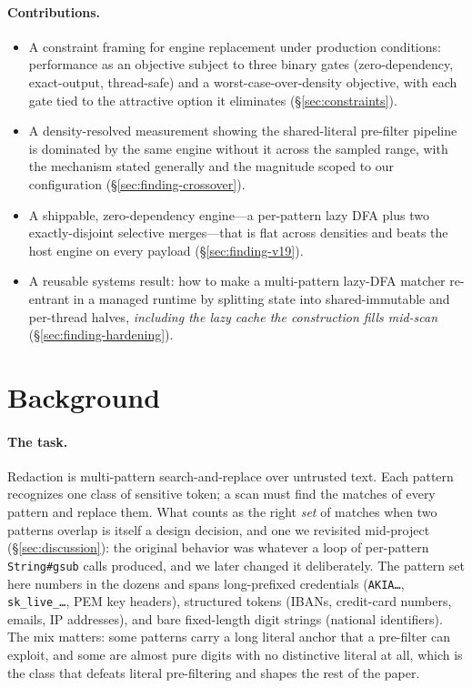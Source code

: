 \documentclass[acmsmall,nonacm,screen]{acmart}
\begin{document}
\paragraph{Contributions.}
\begin{itemize}
  \item A constraint framing for engine replacement under production conditions:
  performance as an objective subject to three binary gates (zero-dependency,
  exact-output, thread-safe) and a worst-case-over-density objective, with each gate
  tied to the attractive option it eliminates (\S\ref{sec:constraints}).
  \item A density-resolved measurement showing the shared-literal pre-filter
  pipeline is dominated by the same engine without it across the sampled range, with
  the mechanism stated generally and the magnitude scoped to our configuration
  (\S\ref{sec:finding-crossover}).
  \item A shippable, zero-dependency engine---a per-pattern lazy DFA plus two
  exactly-disjoint selective merges---that is flat across densities and beats the
  host engine on every payload (\S\ref{sec:finding-v19}).
  \item A reusable systems result: how to make a multi-pattern lazy-DFA matcher
  re-entrant in a managed runtime by splitting state into shared-immutable and
  per-thread halves, \emph{including the lazy cache the construction fills mid-scan}
  (\S\ref{sec:finding-hardening}).
\end{itemize}

\section{Background}
\label{sec:background}
\paragraph{The task.} Redaction is multi-pattern search-and-replace over untrusted
text. Each pattern recognizes one class of sensitive token; a scan must find the
matches of every pattern and replace them. What counts as the right \emph{set} of
matches when two patterns overlap is itself a design decision, and one we revisited
mid-project (\S\ref{sec:discussion}): the original behavior was whatever a loop of
per-pattern \texttt{String\#gsub} calls produced, and we later changed it
deliberately. The pattern set here numbers in the
dozens and spans long-prefixed credentials (\texttt{AKIA\ldots},
\texttt{sk\_live\_\ldots}, PEM key headers), structured tokens (IBANs, credit-card
numbers, emails, IP addresses), and bare fixed-length digit strings (national
identifiers). The mix matters: some patterns carry a long literal anchor that a
pre-filter can exploit, and some are almost pure digits with no distinctive literal
at all, which is the class that defeats literal pre-filtering and shapes the rest of
the paper.
\end{document}
